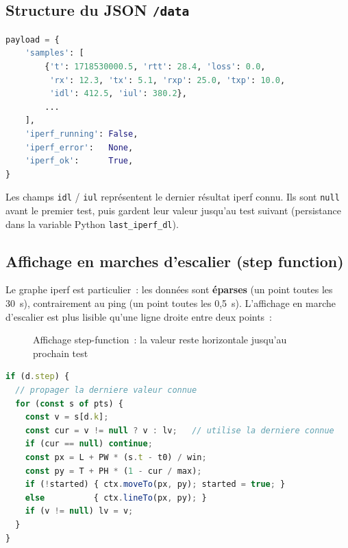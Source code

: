 \documentclass[a4paper,12pt]{article}
\begin{document}
\subsection{Structure du JSON \texttt{/data}}

\begin{lstlisting}[language=Python, caption={Payload /data}]
payload = {
    'samples': [
        {'t': 1718530000.5, 'rtt': 28.4, 'loss': 0.0,
         'rx': 12.3, 'tx': 5.1, 'rxp': 25.0, 'txp': 10.0,
         'idl': 412.5, 'iul': 380.2},
        ...
    ],
    'iperf_running': False,
    'iperf_error':   None,
    'iperf_ok':      True,
}
\end{lstlisting}

Les champs \texttt{idl} / \texttt{iul} représentent le dernier résultat iperf connu.
Ils sont \texttt{null} avant le premier test, puis gardent leur valeur jusqu'au test suivant
(persistance dans la variable Python \texttt{last\_iperf\_dl}).

\subsection{Affichage en marches d'escalier (step function)}

Le graphe iperf est particulier~: les données sont \textbf{éparses} (un point toutes les
30~s), contrairement au ping (un point toutes les 0,5~s). L'affichage en marche d'escalier
est plus lisible qu'une ligne droite entre deux points~:

\begin{figure}[H]
\centering
{}
\caption{Affichage step-function~: la valeur reste horizontale jusqu'au prochain test}
\end{figure}

\begin{lstlisting}[language=JavaScript, caption={Rendu step-function en JavaScript}]
if (d.step) {
  // propager la derniere valeur connue
  for (const s of pts) {
    const v = s[d.k];
    const cur = v != null ? v : lv;   // utilise la derniere connue
    if (cur == null) continue;
    const px = L + PW * (s.t - t0) / win;
    const py = T + PH * (1 - cur / max);
    if (!started) { ctx.moveTo(px, py); started = true; }
    else          { ctx.lineTo(px, py); }
    if (v != null) lv = v;
  }
}
\end{lstlisting}
\end{document}
